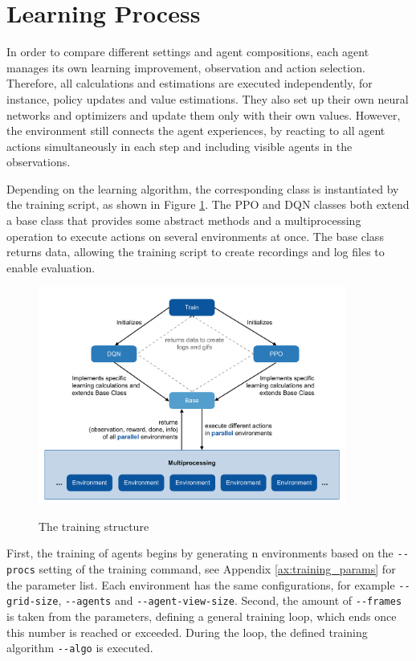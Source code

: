 \section{Learning Process}\label{learning_process}
In order to compare different settings and agent compositions, each agent manages its own learning improvement, observation and action selection. Therefore, all calculations and estimations are executed independently, for instance, policy updates and value estimations. They also set up their own neural networks and optimizers and update them only with their own values. However, the environment still connects the agent experiences, by reacting to all agent actions simultaneously in each step and including visible agents in the observations.

Depending on the learning algorithm, the corresponding class is instantiated by the training script, as shown in Figure \ref{fig:training}. The PPO and DQN classes both extend a base class that provides some abstract methods and a multiprocessing operation to execute actions on several environments at once. The base class returns data, allowing the training script to create recordings and log files to enable evaluation.

\begin{figure}[hpbt]
    \centering
    \includegraphics[width=0.9\textwidth]{pictures/training}\\
    \caption[The Training Structure]{The training structure}\label{fig:training}
\end{figure}

First, the training of agents begins by generating n environments based on the \verb|--procs| setting of the training command, see Appendix \ref{ax:training_params} for the parameter list. Each environment has the same configurations, for example \verb|--grid-size|, \verb|--agents| and \verb|--agent-view-size|. Second, the amount of \verb|--frames| is taken from the parameters, defining a general training loop, which ends once this number is reached or exceeded. During the loop, the defined training algorithm \verb|--algo| is executed.

